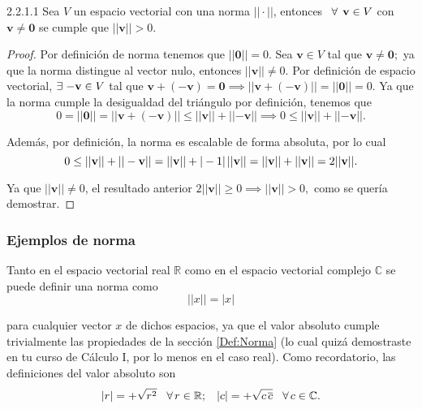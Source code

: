 \documentclass[notasLineal]{subfile}
\begin{document}
\begin{Coro} {2.2.1.1}
    Sea $V$ un espacio vectorial con una norma $||\cdot ||$, entonces $\hspace{1.5mm}\forall\hspace{1.5mm} \mathbf{v}\in V$ con $\mathbf{v}\neq\mathbf{0}$ se cumple que $||\mathbf{v}||>0.$

\begin{proof}
    Por definición de norma tenemos que $||\mathbf{0}||=0$. Sea $\mathbf{v}\in V$ tal que $\mathbf{v}\neq\mathbf{0};$ ya que la norma distingue al vector nulo, entonces $||\mathbf{v}||\neq 0.$ Por definición de espacio vectorial, $\exists\hspace{1mm} \mathbf{-v}\in V$ tal que $\mathbf{v}+(-\mathbf{v})=\mathbf{0}\implies ||\mathbf{v}+(-\mathbf{v})||=||\mathbf{0}||=0$. Ya que la norma cumple la desigualdad del triángulo por definición, tenemos que $$0=||\mathbf{0}||=||\mathbf{v}+(-\mathbf{v})||\leq ||\mathbf{v}||+||\mathbf{-v}||\implies 0\leq ||\mathbf{v}||+||\mathbf{-v}||.$$

\noindent Además, por definición, la norma es escalable de forma absoluta, por lo cual $$0\leq ||\mathbf{v}||+||-\mathbf{v}||=||\mathbf{v}||+|-1|\hspace{0.5mm} ||\mathbf{v}||=||\mathbf{v}||+||\mathbf{v}||=2||\mathbf{v}||.$$

\noindent Ya que $||\mathbf{v}||\neq 0$, el resultado anterior $2||\mathbf{v}||\geq 0\implies ||\mathbf{v}||>0,$ como se quería demostrar.

\end{proof}

\end{Coro}

\subsubsection{Ejemplos de norma}

Tanto en el espacio vectorial real $\mathbb{R}$ como en el espacio vectorial complejo $\mathbb{C}$ se puede definir una norma como $$||x|| = |x|$$

\noindent para cualquier vector $x$ de dichos espacios, ya que el valor absoluto cumple trivialmente las propiedades de la sección \ref{Def:Norma} (lo cual quizá demostraste en tu curso de Cálculo I, por lo menos en el caso real). Como recordatorio, las definiciones del valor absoluto son $$|r| = +\sqrt{r^2} \hspace{3mm}\forall\hspace{0.5mm}r\in\mathbb{
R}; \hspace{3mm} |c| = +\sqrt{c\hspace{0.5mm}\overline{c}}\hspace{3mm}\forall\hspace{0.5mm}c\in\mathbb{C}.$$
\end{document}
